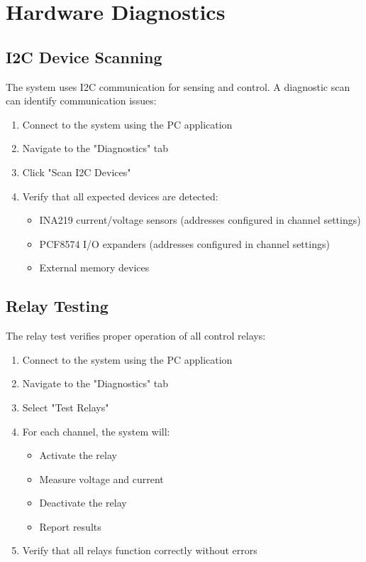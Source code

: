 \documentclass[12pt,a4paper,twoside,openright]{book}
\begin{document}
\section{Hardware Diagnostics}

\subsection{I2C Device Scanning}

The system uses I2C communication for sensing and control. A diagnostic scan can identify communication issues:

\begin{enumerate}
    \item Connect to the system using the PC application
    \item Navigate to the "Diagnostics" tab
    \item Click "Scan I2C Devices"
    \item Verify that all expected devices are detected:
    \begin{itemize}
        \item INA219 current/voltage sensors (addresses configured in channel settings)
        \item PCF8574 I/O expanders (addresses configured in channel settings)
        \item External memory devices
    \end{itemize}
\end{enumerate}

\subsection{Relay Testing}

The relay test verifies proper operation of all control relays:

\begin{enumerate}
    \item Connect to the system using the PC application
    \item Navigate to the "Diagnostics" tab
    \item Select "Test Relays"
    \item For each channel, the system will:
    \begin{itemize}
        \item Activate the relay
        \item Measure voltage and current
        \item Deactivate the relay
        \item Report results
    \end{itemize}
    \item Verify that all relays function correctly without errors
\end{enumerate}
\end{document}
